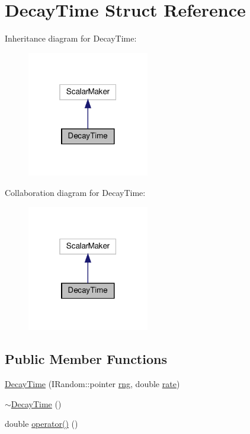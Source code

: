\hypertarget{struct_decay_time}{}\section{Decay\+Time Struct Reference}
\label{struct_decay_time}


Inheritance diagram for Decay\+Time\+:
\nopagebreak
\begin{figure}[H]
\begin{center}
\leavevmode
\includegraphics[width=151pt]{struct_decay_time__inherit__graph}
\end{center}
\end{figure}


Collaboration diagram for Decay\+Time\+:
\nopagebreak
\begin{figure}[H]
\begin{center}
\leavevmode
\includegraphics[width=151pt]{struct_decay_time__coll__graph}
\end{center}
\end{figure}
\subsection*{Public Member Functions}
\begin{DoxyCompactItemize}
\item 
\hyperlink{struct_decay_time_a4499a1e581978cdc034274139017e1cb}{Decay\+Time} (I\+Random\+::pointer \hyperlink{struct_decay_time_a12b72a0c00ea60b09bb0fd03bea2b519}{rng}, double \hyperlink{struct_decay_time_a6fda8b08aa27b4ff40ada16d00c67363}{rate})
\item 
\hyperlink{struct_decay_time_a4d665baf95f039de72a3a286d621d96a}{$\sim$\+Decay\+Time} ()
\item 
double \hyperlink{struct_decay_time_ae7d39c94926359f301446df6c7acd5db}{operator()} ()
\end{DoxyCompactItemize}
